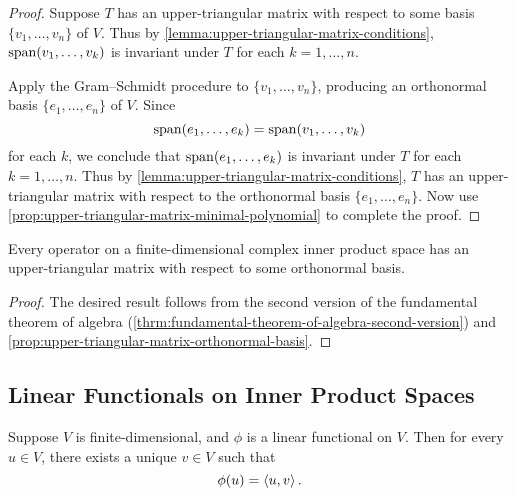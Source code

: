 \begin{proof}
Suppose $T$ has an upper-triangular matrix with respect to some basis $\{v_1,\dots,v_n\}$ of $V$. Thus by \ref{lemma:upper-triangular-matrix-conditions}, $\operatorname{span}(v_1,\dots,v_k)$ is invariant under $T$ for each $k=1,\dots,n$.

Apply the Gram--Schmidt procedure to $\{v_1,\dots,v_n\}$, producing an orthonormal basis $\{e_1,\dots,e_n\}$ of $V$. Since
\[\operatorname{span}(e_1,\dots,e_k)=\operatorname{span}(v_1,\dots,v_k)\]
for each $k$, we conclude that $\operatorname{span}(e_1,\dots,e_k)$ is invariant under $T$ for each $k=1,\dots,n$. Thus by \ref{lemma:upper-triangular-matrix-conditions}, $T$ has an upper-triangular matrix with respect to the orthonormal basis $\{e_1,\dots,e_n\}$. Now use \ref{prop:upper-triangular-matrix-minimal-polynomial} to complete the proof.
\end{proof}

\begin{theorem}
Every operator on a finite-dimensional complex inner product space has an upper-triangular matrix with respect to some orthonormal basis.
\end{theorem}

\begin{proof}
The desired result follows from the second version of the fundamental theorem of algebra (\ref{thrm:fundamental-theorem-of-algebra-second-version}) and \ref{prop:upper-triangular-matrix-orthonormal-basis}.
\end{proof}
\pagebreak

\subsection{Linear Functionals on Inner Product Spaces}
\begin{theorem}
Suppose $V$ is finite-dimensional, and $\phi$ is a linear functional on $V$. Then for every $u\in V$, there exists a unique $v\in V$ such that
\[\phi(u)=\left\langle u,v\right\rangle.\]
\end{theorem}

